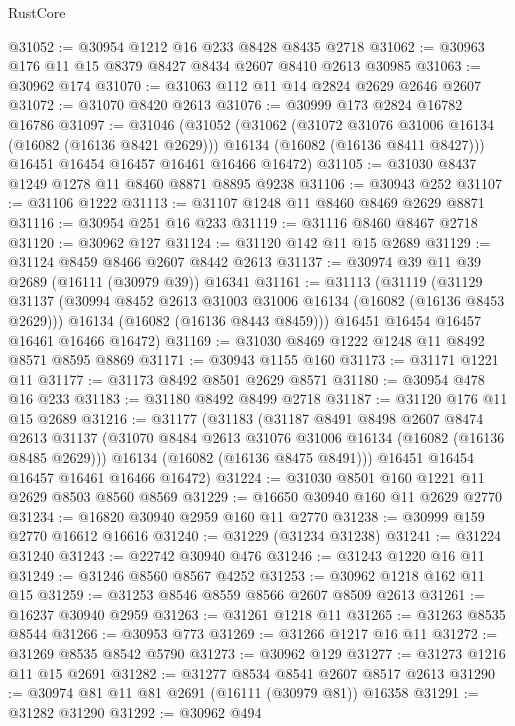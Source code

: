 \begin{lexlean}{RustCore}
\begin{coremodule}
@31052 := @30954 @1212 @16 @233 @8428 @8435 @2718
@31062 := @30963 @176 @11 @15 @8379 @8427 @8434 @2607 @8410 @2613 @30985
@31063 := @30962 @174
@31070 := @31063 @112 @11 @14 @2824 @2629 @2646 @2607
@31072 := @31070 @8420 @2613
@31076 := @30999 @173 @2824 @16782 @16786
@31097 := @31046
    (@31052
      (@31062
        (@31072 @31076 @31006 @16134 (@16082 (@16136 @8421 @2629)))
        @16134
        (@16082 (@16136 @8411 @8427)))
      @16451
      @16454
      @16457
      @16461
      @16466
      @16472)
@31105 := @31030 @8437 @1249 @1278 @11 @8460 @8871 @8895 @9238
@31106 := @30943 @252
@31107 := @31106 @1222
@31113 := @31107 @1248 @11 @8460 @8469 @2629 @8871
@31116 := @30954 @251 @16 @233
@31119 := @31116 @8460 @8467 @2718
@31120 := @30962 @127
@31124 := @31120 @142 @11 @15 @2689
@31129 := @31124 @8459 @8466 @2607 @8442 @2613
@31137 := @30974 @39 @11 @39 @2689 (@16111 (@30979 @39)) @16341
@31161 := @31113
    (@31119
      (@31129
        @31137
        (@30994 @8452 @2613 @31003 @31006 @16134 (@16082 (@16136 @8453 @2629)))
        @16134
        (@16082 (@16136 @8443 @8459)))
      @16451
      @16454
      @16457
      @16461
      @16466
      @16472)
@31169 := @31030 @8469 @1222 @1248 @11 @8492 @8571 @8595 @8869
@31171 := @30943 @1155 @160
@31173 := @31171 @1221 @11
@31177 := @31173 @8492 @8501 @2629 @8571
@31180 := @30954 @478 @16 @233
@31183 := @31180 @8492 @8499 @2718
@31187 := @31120 @176 @11 @15 @2689
@31216 := @31177
    (@31183
      (@31187
        @8491
        @8498
        @2607
        @8474
        @2613
        @31137
        (@31070 @8484 @2613 @31076 @31006 @16134 (@16082 (@16136 @8485 @2629)))
        @16134
        (@16082 (@16136 @8475 @8491)))
      @16451
      @16454
      @16457
      @16461
      @16466
      @16472)
@31224 := @31030 @8501 @160 @1221 @11 @2629 @8503 @8560 @8569
@31229 := @16650 @30940 @160 @11 @2629 @2770
@31234 := @16820 @30940 @2959 @160 @11 @2770
@31238 := @30999 @159 @2770 @16612 @16616
@31240 := @31229 (@31234 @31238)
@31241 := @31224 @31240
@31243 := @22742 @30940 @476
@31246 := @31243 @1220 @16 @11
@31249 := @31246 @8560 @8567 @4252
@31253 := @30962 @1218 @162 @11 @15
@31259 := @31253 @8546 @8559 @8566 @2607 @8509 @2613
@31261 := @16237 @30940 @2959
@31263 := @31261 @1218 @11
@31265 := @31263 @8535 @8544
@31266 := @30953 @773
@31269 := @31266 @1217 @16 @11
@31272 := @31269 @8535 @8542 @5790
@31273 := @30962 @129
@31277 := @31273 @1216 @11 @15 @2691
@31282 := @31277 @8534 @8541 @2607 @8517 @2613
@31290 := @30974 @81 @11 @81 @2691 (@16111 (@30979 @81)) @16358
@31291 := @31282 @31290
@31292 := @30962 @494

\end{coremodule}
\end{lexlean}

